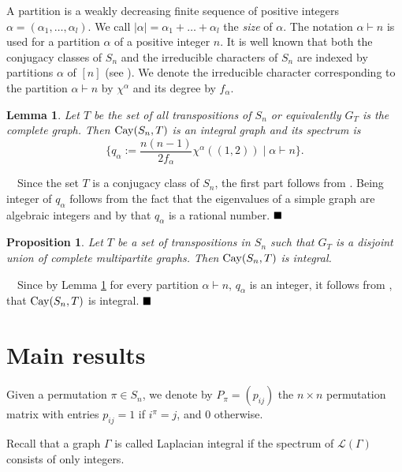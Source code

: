 \documentclass[12pt,a4paper]{article}
\newtheorem{proposition}{\bf Proposition}
\newtheorem{lemma}{\bf Lemma}
\renewcommand{\proof}{\noindent{\it\textbf{Proof.}}\ \ }
\newcommand{\Cay}{{\rm Cay}}
\newcommand{\eqd}{$\hfill \blacksquare$}
\begin{document}
A partition is a weakly decreasing finite sequence of positive integers $\alpha=(\alpha_1, \dots, \alpha_l)$. We call $|\alpha|=\alpha_1+\dots+\alpha_l$ the \textit{size} of $\alpha$. The notation $\alpha \vdash n$ is used for a partition $\alpha$ of a positive integer $n$. It is well known that both the conjugacy classes of $S_n$ and the irreducible characters of $S_n$ are indexed by partitions $\alpha$ of $[n]$ (see \cite{GA}). We 
denote the irreducible character corresponding to the partition $\alpha\vdash n$ by $\chi^\alpha$ and its degree by $f_\alpha$.


\begin{lemma}\label{lemm1} Let $T$ be the set of all transpositions of $S_n$ or equivalently $G_T$ is the complete graph. Then  $\Cay(S_n,T)$ is an integral graph and its spectrum is 
$$\big\lbrace{q_\alpha:=\frac{n(n-1)}{2f_\alpha}\chi^\alpha((1,2)) \;|\; \alpha\vdash n\big\rbrace}.$$
\end{lemma}
\proof Since the set $T$ is a conjugacy class of $S_n$,  the first part follows from \cite[Lemma 5]{DS}.    Being integer of $q_\alpha$ follows from  the fact that the eigenvalues of a simple graph are algebraic integers and by \cite[Lemma 7]{DS} that $q_\alpha$ is a rational number. 
\eqd

\begin{proposition}\label{multipartite}
Let $T$ be a set of transpositions in $S_n$ such that $G_T$ is a disjoint union of complete multipartite graphs. Then $\Cay(S_n,T)$ is integral.
\end{proposition}
\proof Since by Lemma \ref{lemm1} for every partition $\alpha\vdash n$, $q_\alpha$ is an integer, it follows from \cite[Theorem 5.3 and Proposition 5.2]{C}, that $\Cay(S_n,T)$ is integral.
\eqd
\section{Main results}


Given a permutation $\pi\in S_n$, we denote by $P_\pi=(p_{ij})$ the $n\times n$ permutation matrix with entries $p_{ij}=1$ if $i^\pi=j$, and $0$ otherwise.

Recall that a graph $\Gamma$ is called Laplacian integral if the spectrum of $\mathcal{L}(\Gamma)$ consists of only integers. 
\end{document}
